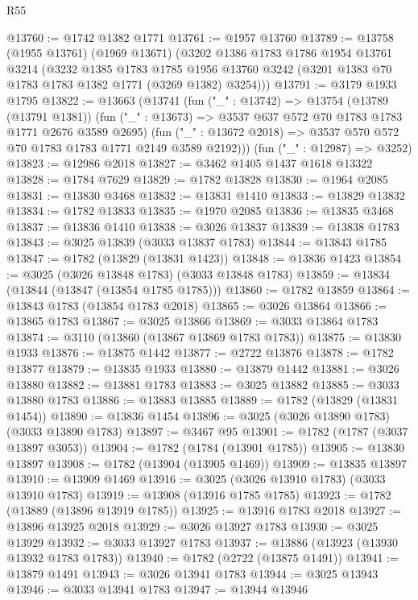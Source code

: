 \begin{lexlean}{R55}
\begin{coremodule}
@13760 := @1742 @1382 @1771
@13761 := @1957 @13760
@13789 := @13758
    (@1955 @13761)
    (@1969 @13671)
    (@3202
      @1386
      @1783
      @1786
      @1954
      @13761
      @3214
      (@3232
        @1385
        @1783
        @1785
        @1956
        @13760
        @3242
        (@3201 @1383 @70 @1783 @1783 @1382 @1771 (@3269 @1382) @3254)))
@13791 := @3179 @1933 @1795
@13822 := @13663
    (@13741
      (fun ("_" : @13742) =>
      @13754
        (@13789 (@13791 @1381))
        (fun ("_" : @13673) => @3537 @637 @572 @70 @1783 @1783 @1771 @2676 @3589 @2695)
        (fun ("_" : @13672 @2018) => @3537 @570 @572 @70 @1783 @1783 @1771 @2149 @3589 @2192)))
    (fun ("_" : @12987) => @3252)
@13823 := @12986 @2018
@13827 := @3462 @1405 @1437 @1618 @13322
@13828 := @1784 @7629
@13829 := @1782 @13828
@13830 := @1964 @2085
@13831 := @13830 @3468
@13832 := @13831 @1410
@13833 := @13829 @13832
@13834 := @1782 @13833
@13835 := @1970 @2085
@13836 := @13835 @3468
@13837 := @13836 @1410
@13838 := @3026 @13837
@13839 := @13838 @1783
@13843 := @3025 @13839 (@3033 @13837 @1783)
@13844 := @13843 @1785
@13847 := @1782 (@13829 (@13831 @1423))
@13848 := @13836 @1423
@13854 := @3025 (@3026 @13848 @1783) (@3033 @13848 @1783)
@13859 := @13834 (@13844 (@13847 (@13854 @1785 @1785)))
@13860 := @1782 @13859
@13864 := @13843 @1783 (@13854 @1783 @2018)
@13865 := @3026 @13864
@13866 := @13865 @1783
@13867 := @3025 @13866
@13869 := @3033 @13864 @1783
@13874 := @3110 (@13860 (@13867 @13869 @1783 @1783))
@13875 := @13830 @1933
@13876 := @13875 @1442
@13877 := @2722 @13876
@13878 := @1782 @13877
@13879 := @13835 @1933
@13880 := @13879 @1442
@13881 := @3026 @13880
@13882 := @13881 @1783
@13883 := @3025 @13882
@13885 := @3033 @13880 @1783
@13886 := @13883 @13885
@13889 := @1782 (@13829 (@13831 @1454))
@13890 := @13836 @1454
@13896 := @3025 (@3026 @13890 @1783) (@3033 @13890 @1783)
@13897 := @3467 @95
@13901 := @1782 (@1787 (@3037 @13897 @3053))
@13904 := @1782 (@1784 (@13901 @1785))
@13905 := @13830 @13897
@13908 := @1782 (@13904 (@13905 @1469))
@13909 := @13835 @13897
@13910 := @13909 @1469
@13916 := @3025 (@3026 @13910 @1783) (@3033 @13910 @1783)
@13919 := @13908 (@13916 @1785 @1785)
@13923 := @1782 (@13889 (@13896 @13919 @1785))
@13925 := @13916 @1783 @2018
@13927 := @13896 @13925 @2018
@13929 := @3026 @13927 @1783
@13930 := @3025 @13929
@13932 := @3033 @13927 @1783
@13937 := @13886 (@13923 (@13930 @13932 @1783 @1783))
@13940 := @1782 (@2722 (@13875 @1491))
@13941 := @13879 @1491
@13943 := @3026 @13941 @1783
@13944 := @3025 @13943
@13946 := @3033 @13941 @1783
@13947 := @13944 @13946

\end{coremodule}
\end{lexlean}
